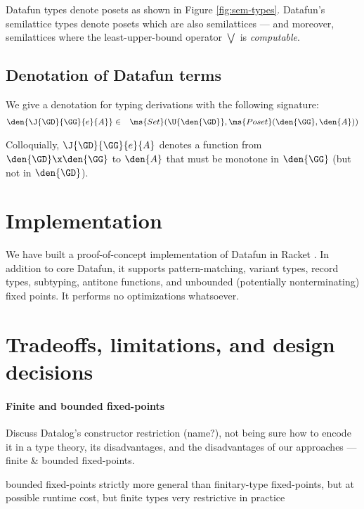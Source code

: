 \documentclass[preprint]{sigplanconf}
\begin{document}
Datafun types denote posets as shown in Figure \ref{fig:sem-types}. Datafun's
semilattice types denote posets which are also semilattices --- and moreover,
semilattices where the least-upper-bound operator $\bigvee$ is
\emph{computable}.  

\subsection{Denotation of Datafun terms}

We give a denotation for typing derivations with the following signature:
\begin{eqnarray*}
  \den{\J{\GD}{\GG}{e}{A}} &\in&
  \ms{Set}(\U{\den{\GD}}, \ms{Poset}(\den{\GG}, \den{A}))
\end{eqnarray*}

Colloquially, $\J{\GD}{\GG}{e}{A}$ denotes a function from $\den{\GD} \x
\den{\GG}$ to $\den{A}$ that must be monotone in $\den{\GG}$ (but not in
$\den{\GD}$).


\section{Implementation}
We have built a proof-of-concept implementation of Datafun in Racket
. In addition to core Datafun, it supports pattern-matching, variant
types, record types, subtyping, antitone functions, and unbounded (potentially
nonterminating) fixed points. It performs no optimizations whatsoever.



\section{Tradeoffs, limitations, and design decisions}

\paragraph{Finite and bounded fixed-points} \TODO Discuss
Datalog's constructor restriction (name?), not being sure how to encode it in a
type theory, its disadvantages, and the disadvantages of our approaches ---
finite \& bounded fixed-points.

bounded fixed-points strictly more general than finitary-type fixed-points, but
at possible runtime cost, but finite types very restrictive in practice
\end{document}
